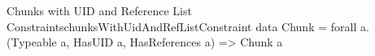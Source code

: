 \begin{pseudohaskell}{Chunks with UID and Reference List Constraints}{chunksWithUidAndRefListConstraint}
data Chunk = forall a. (Typeable a, HasUID a, HasReferences a) => Chunk a
\end{pseudohaskell}
